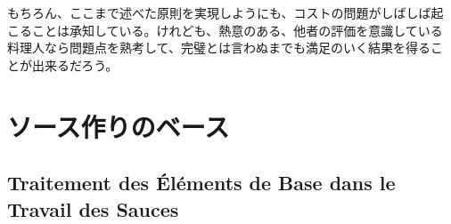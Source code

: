 \documentclass[twoside,12Q,b5j]{escoffierltjsbook}
\begin{document}
もちろん、ここまで述べた原則を実現しようにも、コストの問題がしばしば起
こることは承知している。けれども、熱意のある、他者の評価を意識している
料理人なら問題点を熟考して、完璧とは言わぬまでも満足のいく結果を得るこ
とが出来るだろう。

\section{ソース作りのベース}\label{ux30bdux30fcux30b9ux4f5cux308aux306eux30d9ux30fcux30b9}

\subsection{Traitement des Éléments de Base dans le Travail des
Sauces}\label{traitement-des-elements-de-base-dans-le-travail-des-sauces}

\end{document}
